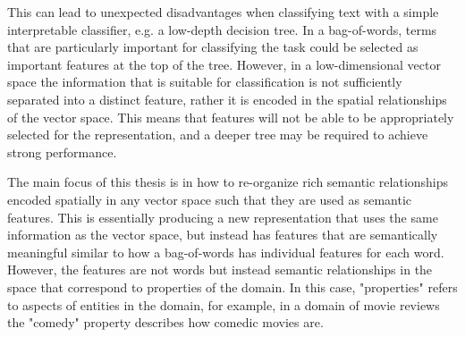 This can lead to unexpected disadvantages when classifying text with a simple interpretable classifier, e.g. a low-depth decision tree. In a bag-of-words, terms that are particularly important for classifying the task could be selected as important features at the top of the tree. However, in a low-dimensional vector space the information that is suitable for classification is not sufficiently separated into a distinct feature, rather it is encoded in the spatial relationships of the vector space. This means that features will not be able to be appropriately selected for the representation, and a deeper tree may be required to achieve strong performance.

The main focus of this thesis is in how to re-organize rich semantic relationships encoded spatially in any vector space  such that they are used as semantic features. This is essentially producing a new representation that uses the same information as the vector space, but instead has features that are semantically meaningful similar to how a bag-of-words has individual features for each word. However, the features are not words but instead semantic relationships in the space that correspond to properties of the domain. In this case, "properties" refers to aspects of entities in the domain, for example, in a domain of movie reviews the "comedy" property describes how comedic movies are.















